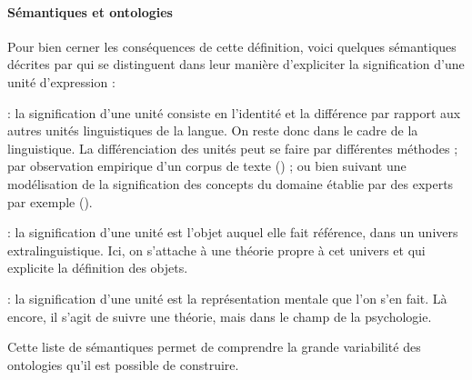 \paragraph{Sémantiques et ontologies}
Pour bien cerner les conséquences de cette définition, voici quelques sémantiques décrites par \cite{bachimont:hdr} qui se distinguent dans leur manière d'expliciter la signification d'une unité d'expression : 
\begin{liste}
	\item {} : la signification d'une unité consiste en l'identité et la différence par rapport aux autres unités linguistiques de la langue. On reste donc dans le cadre de la linguistique. La différenciation des  unités peut se faire par différentes méthodes ; par observation empirique d'un corpus de texte () ; ou bien suivant une modélisation de la signification des concepts du domaine établie par des experts par exemple (). 

	\item {} : la signification d'une unité est l'objet auquel elle fait référence, dans un univers extralinguistique. Ici, on s'attache à une théorie propre à cet univers et qui explicite la définition des objets.
	
	\item {} : la signification d'une unité est la représentation mentale que l'on s'en fait. Là encore, il s'agit de suivre une théorie, mais dans le champ de la psychologie. 
\end{liste}
Cette liste de sémantiques permet de comprendre la grande variabilité des ontologies qu'il est possible de construire. 


